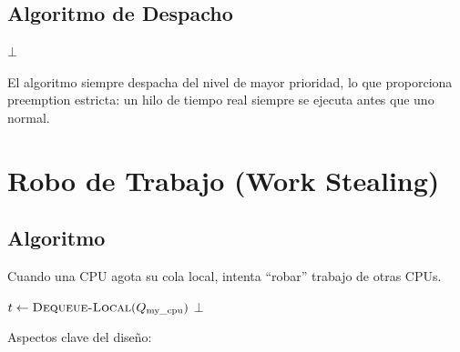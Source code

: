 \documentclass[11pt,twoside,openright]{book}
\theoremstyle{definition}
\theoremstyle{plain}
\theoremstyle{remark}
\begin{document}
\subsection{Algoritmo de Despacho}

\begin{algorithm}[H]
\caption{\textsc{Dequeue-Local}$(Q_{\text{cpu}})$: Despachar el siguiente hilo de la CPU local.}
\label{alg:dequeue-local}
\Return $\bot$\;
\end{algorithm}

El algoritmo siempre despacha del nivel de mayor prioridad, lo que proporciona preemption
estricta: un hilo de tiempo real siempre se ejecuta antes que uno normal.

\section{Robo de Trabajo (Work Stealing)}

\subsection{Algoritmo}

Cuando una CPU agota su cola local, intenta ``robar'' trabajo de otras CPUs.

\begin{algorithm}[H]
\caption{\textsc{Dequeue-Any}$(\text{my\_cpu})$: Despachar con robo de trabajo.}
\label{alg:dequeue-any}
$t \gets \textsc{Dequeue-Local}(Q_{\text{my\_cpu}})$\;
\Return $\bot$
\end{algorithm}

Aspectos clave del diseño:
\end{document}
